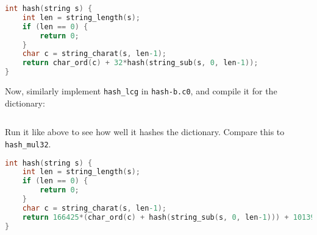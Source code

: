 \begin{solution}
\begin{lstlisting}[language={C}]
int hash(string s) {
    int len = string_length(s);
    if (len == 0) {
        return 0;
    }
    char c = string_charat(s, len-1);
    return char_ord(c) + 32*hash(string_sub(s, 0, len-1));
}
\end{lstlisting}
\end{solution}

\begin{part}
  Now, similarly implement \lstinline'hash_lcg' in
  \lstinline'hash-b.c0', and compile it for the dictionary:
\begin{lstlisting}[language={[coin]C}, basicstyle=\smallbasicstyle,
                   belowskip=0pt]
  % cc0 hash-b.c0 hash-dictionary.c0 visualizer.c0
\end{lstlisting}
Run it like above to see how well it hashes the dictionary. Compare
this to \lstinline'hash_mul32'.

\twoPT
\end{part}

\begin{solution}
\begin{lstlisting}[language={C}]
int hash(string s) {
    int len = string_length(s);
    if (len == 0) {
        return 0;
    }
    char c = string_charat(s, len-1);
    return 166425*(char_ord(c) + hash(string_sub(s, 0, len-1))) + 1013904223;
}
\end{lstlisting}
\end{solution}
